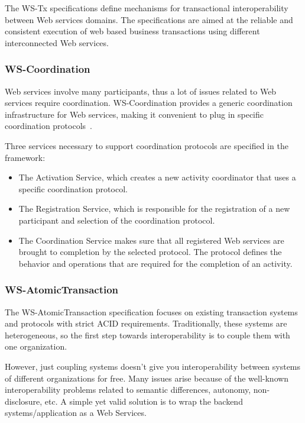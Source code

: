 \documentclass{sig-alternate-05-2015}
\begin{document}
The WS-Tx specifications define mechanisms for transactional
interoperability between Web services domains. The specifications are
aimed at the reliable and consistent execution of web based business
transactions using different interconnected Web services.

\subsubsection{WS-Coordination}
\label{sec:wsc}

Web services involve many participants, thus a lot of issues related
to Web services require coordination. WS-Coordination provides a
generic coordination infrastructure for Web services, making it
convenient to plug in specific coordination
protocols~\cite{little2003introducing}.

Three services necessary to support coordination protocols are
specified in the framework:

\begin{itemize}
\item The Activation Service, which creates a new activity coordinator
  that uses a specific coordination protocol.
\item The Registration Service, which is responsible for the
  registration of a new participant and selection of the coordination
  protocol.
\item The Coordination Service makes sure that all registered Web
  services are brought to completion by the selected protocol. The
  protocol defines the behavior and operations that are required for
  the completion of an activity.
\end{itemize}


\subsubsection{WS-AtomicTransaction}
\label{sec:wsat}

The WS-AtomicTransaction specification focuses on existing transaction
systems and protocols with strict ACID requirements. Traditionally,
these systems are heterogeneous, so the first step towards
interoperability is to couple them with one organization.

However, just coupling systems doesn't give you interoperability
between systems of different organizations for free. Many issues arise
because of the well-known interoperability problems related to
semantic differences, autonomy, non-disclosure, etc. A simple yet
valid solution is to wrap the backend systems/application as a Web
Services.
\end{document}
